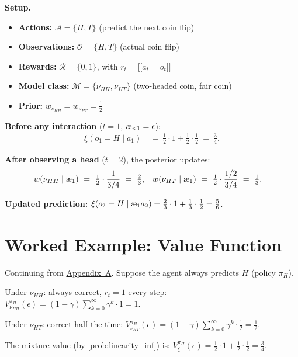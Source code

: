 \documentclass[fontsize=11pt, parskip=half]{scrartcl}
\newcommand{\llbracket}{\mathopen{[\![}}
\newcommand{\rrbracket}{\mathclose{]\!]}}
\newcommand{\cA}{\mathcal{A}}
\newcommand{\cO}{\mathcal{O}}
\newcommand{\cR}{\mathcal{R}}
\newcommand{\cM}{\mathcal{M}}
\newcommand{\aes}{\textnormal{\ae}}
\begin{document}
\begin{callout}[note]
\textbf{Setup.}
\begin{itemize}\itemsep=2pt
\item \textbf{Actions:} $\cA = \{H, T\}$ (predict the next coin flip)
\item \textbf{Observations:} $\cO = \{H, T\}$ (actual coin flip)
\item \textbf{Rewards:} $\cR = \{0, 1\}$, with $r_t = \llbracket a_t = o_t \rrbracket$
\item \textbf{Model class:} $\cM = \{\nu_{HH}, \nu_{HT}\}$ (two-headed coin, fair coin)
\item \textbf{Prior:} $w_{\nu_{HH}} = w_{\nu_{HT}} = \tfrac{1}{2}$
\end{itemize}
\end{callout}

\textbf{Before any interaction} ($t=1$, $\aes_{<1} = \epsilon$):
\begin{align*}
    \xi(o_1 = H \mid a_1) ~&=~ \tfrac{1}{2} \cdot 1 + \tfrac{1}{2} \cdot \tfrac{1}{2} ~=~ \tfrac{3}{4}.
\end{align*}

\textbf{After observing a head} ($t=2$), the posterior updates:
\begin{align*}
    w(\nu_{HH} \mid \aes_{1}) ~&=~ \tfrac{1}{2} \cdot \frac{1}{3/4} ~=~ \tfrac{2}{3}, &
    w(\nu_{HT} \mid \aes_{1}) ~&=~ \tfrac{1}{2} \cdot \frac{1/2}{3/4} ~=~ \tfrac{1}{3}.
\end{align*}

\textbf{Updated prediction:}
$\xi(o_2 = H \mid \aes_{1} a_2) = \tfrac{2}{3} \cdot 1 + \tfrac{1}{3} \cdot \tfrac{1}{2} = \tfrac{5}{6}$.


\section{Worked Example: Value Function}\label{sec:appendix_value}

Continuing from \hyperref[sec:appendix_mixture]{Appendix~A}. Suppose the agent always predicts $H$ (policy $\pi_H$).

Under $\nu_{HH}$: always correct, $r_t = 1$ every step:
$V_{\nu_{HH}}^{\pi_H}(\epsilon) = (1-\gamma) \sum_{k=0}^\infty \gamma^k \cdot 1 = 1$.

Under $\nu_{HT}$: correct half the time:
$V_{\nu_{HT}}^{\pi_H}(\epsilon) = (1-\gamma) \sum_{k=0}^\infty \gamma^k \cdot \tfrac{1}{2} = \tfrac{1}{2}$.

The mixture value (by \cref{prob:linearity_inf}) is:
$V_\xi^{\pi_H}(\epsilon) = \tfrac{1}{2} \cdot 1 + \tfrac{1}{2} \cdot \tfrac{1}{2} = \tfrac{3}{4}$.
\end{document}
